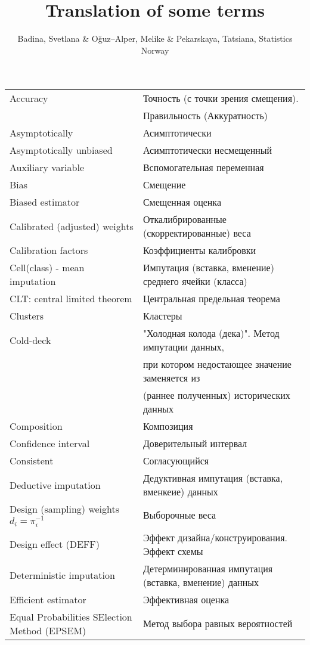 \documentclass[12pt]{article}
\begin{document}
\title{Translation of some terms}
\author{Badina, Svetlana \& O\u{g}uz--Alper, Melike \& Pekarskaya, Tatsiana, Statistics Norway}
\maketitle
\small
\begin{center}
\begin{tabular}{l|l}
\hline

Accuracy & Точность (с точки зрения смещения).\\ & Правильность (Аккуратность) \\
Asymptotically & Асимптотически \\
Asymptotically unbiased & Асимптотически несмещенный\\
Auxiliary variable & Вспомогательная переменная\\
Bias & Смещение   \\
Biased estimator & Смещенная оценка\\
Calibrated (adjusted) weights & Откалибрированные (скорректированные) веса\\
Calibration factors & Коэффициенты калибровки\\
Cell(class) - mean imputation & Импутация (вставка, вменение) среднего ячейки (класса)\\
CLT: central limited theorem & Центральная предельная теорема \\
Clusters & Кластеры\\
Cold-deck & "Холодная колода (дека)". Метод импутации данных, \\ & при котором недостающее  значение заменяется из \\ &(раннее полученных) исторических данных \\
Composition & Композиция\\
Confidence interval & Доверительный интервал \\
Consistent & Согласующийся\\
Deductive imputation & Дедуктивная импутация (вставка, вменкеие) данных\\
Design (sampling) weights $d_i = \pi_i^{-1}$ & Выборочные веса \\
Design effect (DEFF) & Эффект дизайна/конструирования. Эффект схемы\\
Deterministic imputation & Детерминированная импутация (вставка, вменение) данных\\
Efficient estimator & Эффективная оценка \\
Equal Probabilities SElection Method (EPSEM) & Метод выбора равных вероятностей \\

\end{tabular}
\end{center}
\end{document}

